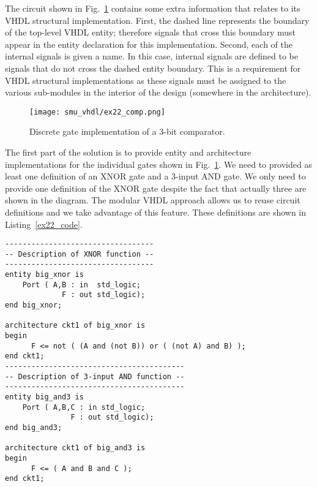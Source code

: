 The circuit shown in Fig.~\ref{ex22_comp} contains some extra information that relates to its VHDL structural implementation. First, the dashed line represents the boundary of the top-level VHDL entity; therefore signals that cross this boundary must appear in the entity declaration for this implementation. Second, each of the internal signals is given a name. In this case, internal signals are defined to be signals that do not cross the dashed entity boundary. This is a requirement for VHDL structural implementations as these signals must be assigned to the various sub-modules in the interior of the design (somewhere in the architecture). 

\begin{figure}[!h]
    \centering
	\texttt{[image: smu\_vhdl/ex22\_comp.png]}
	\caption{Discrete gate implementation of a 3-bit comparator.}
	\label{ex22_comp}
\end{figure}

The first part of the solution is to provide entity and architecture implementations for the individual gates shown in Fig.~\ref{ex22_comp}. We need to provided as least one definition of an XNOR gate and a 3-input AND gate. We only need to provide one definition of the XNOR gate despite the fact that actually three are shown in the diagram. The modular VHDL approach allows us to reuse circuit definitions and we take advantage of this feature. These definitions are shown in Listing~\ref{ex22_code}. 

\noindent
\begin{minipage}{0.99\linewidth}
\begin{lstlisting}[label=ex22_code, caption=Entity and Architecture definitions for discrete gates.]
----------------------------------
-- Description of XNOR function --
----------------------------------
entity big_xnor is
    Port ( A,B : in  std_logic;
             F : out std_logic);
end big_xnor;

architecture ckt1 of big_xnor is
begin
      F <= not ( (A and (not B)) or ( (not A) and B) ); 
end ckt1;   
-----------------------------------------
-- Description of 3-input AND function --
-----------------------------------------
entity big_and3 is
    Port ( A,B,C : in std_logic;
               F : out std_logic);
end big_and3;

architecture ckt1 of big_and3 is
begin
      F <= ( A and B and C ); 
end ckt1;
\end{lstlisting}
\end{minipage}

